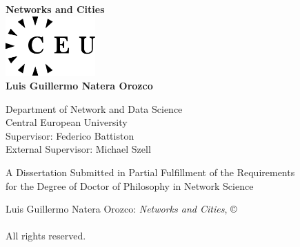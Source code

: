 \documentclass[a4paper,twoside,12pt]{book}
\begin{document}
\begin{titlepage}
\begin{center}

\textbf{\LARGE{Networks and Cities}}\\[3.3cm]

\includegraphics[width=3.45cm,height=2.3cm]{images/ceulogo.eps}\\[3.4cm]
{\Large{\textbf{Luis Guillermo Natera Orozco}}}\\[0.4cm]

\medskip

Department of Network and Data Science \\
Central European University\\ [1.2cm]

Supervisor: Federico Battiston \\
External Supervisor: Michael Szell

\vfill  

A Dissertation Submitted in Partial Fulfillment of the Requirements\\ for the Degree of Doctor of Philosophy in Network Science\\[2cm]


\vspace{1.0cm}
\the\year
\end{center}
\end{titlepage}

\newpage

\pagestyle{empty}

\mbox{}

\vfill

\noindent Luis Guillermo Natera Orozco: \emph{Networks and Cities}, \copyright \\
\the\year \\ All rights reserved.



\mbox{}

\pagestyle{empty}

\newpage
\end{document}
